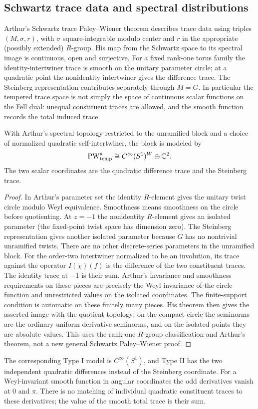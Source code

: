 \subsection{Schwartz trace data and spectral distributions}\label{subsec:schwartz-pw}
Arthur's Schwartz trace Paley--Wiener theorem \cite[Theorem, p.~174]{Ar94} describes trace data using triples $(M,\sigma,r)$, with $\sigma$ square-integrable modulo center and $r$ in the appropriate (possibly extended) $R$-group. His map from the Schwartz space to its spectral image is continuous, open and surjective. For a fixed rank-one torus family the identity-intertwiner trace is smooth on the unitary parameter circle; at a quadratic point the nonidentity intertwiner gives the difference trace. The Steinberg representation contributes separately through $M=G$. In particular the tempered trace space is not simply the space of continuous scalar functions on the Fell dual: unequal constituent traces are allowed, and the smooth function records the total induced trace.

\begin{proposition}\label{prop:schwartz-pw}
With Arthur's spectral topology restricted to the unramified block and a choice of normalized quadratic self-intertwiner, the block is modeled by
\[\operatorname{PW}_{\rm temp}^{\mathfrak s}\cong C^\infty(S^1)^W\oplus\mathbb C^2.\]
The two scalar coordinates are the quadratic difference trace and the Steinberg trace.
\end{proposition}
\begin{proof}
In Arthur's parameter set the identity $R$-element gives the unitary twist circle modulo Weyl equivalence. Smoothness means smoothness on the circle before quotienting. At $z=-1$ the nonidentity $R$-element gives an isolated parameter (the fixed-point twist space has dimension zero). The Steinberg representation gives another isolated parameter because $G$ has no nontrivial unramified twists. There are no other discrete-series parameters in the unramified block. For the order-two intertwiner normalized to be an involution, its trace against the operator $I(\chi)(f)$ is the difference of the two constituent traces. The identity trace at $-1$ is their sum. Arthur's invariance and smoothness requirements on these pieces are precisely the Weyl invariance of the circle function and unrestricted values on the isolated coordinates. The finite-support condition is automatic on these finitely many pieces. His theorem then gives the asserted image with the quotient topology: on the compact circle the seminorms are the ordinary uniform derivative seminorms, and on the isolated points they are absolute values. This uses the rank-one $R$-group classification and Arthur's theorem, not a new general Schwartz Paley--Wiener proof.
\end{proof}
The corresponding Type I model is $C^\infty(S^1)$, and Type II has the two independent quadratic differences instead of the Steinberg coordinate. For a Weyl-invariant smooth function in angular coordinates the odd derivatives vanish at $0$ and $\pi$. There is no matching of individual quadratic constituent traces to these derivatives; the value of the smooth total trace is their sum.


